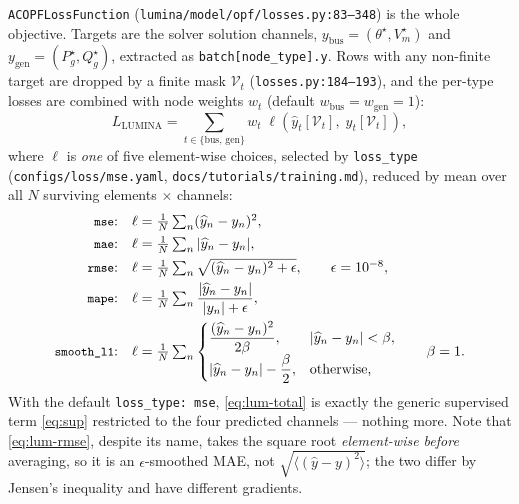 \documentclass[11pt]{article}
\newcommand{\pred}[1]{\widehat{#1}}
\newcommand{\code}[1]{\texttt{\small #1}}
\begin{document}
\code{ACOPFLossFunction} (\code{lumina/model/opf/losses.py:83--348}) is the whole objective.
Targets are the solver solution channels, $y_{\mathrm{bus}}=(\theta^\star,V^\star_m)$ and
$y_{\mathrm{gen}}=(P^\star_g,Q^\star_g)$, extracted as \code{batch[node\_type].y}. Rows with
any non-finite target are dropped by a finite mask $\mathcal{V}_t$
(\code{losses.py:184--193}), and the per-type losses are combined with node weights
$w_t$ (default $w_{\mathrm{bus}}=w_{\mathrm{gen}}=1$):
\begin{equation}
\boxed{\;
L_{\mathrm{LUMINA}}
=\sum_{t\in\{\mathrm{bus},\,\mathrm{gen}\}} w_t\;
\ell\!\left(\pred{y}_t[\mathcal{V}_t],\;y_t[\mathcal{V}_t]\right),
\;}
\label{eq:lum-total}
\end{equation}
where $\ell$ is \emph{one} of five element-wise choices, selected by \code{loss\_type}
(\code{configs/loss/mse.yaml}, \code{docs/tutorials/training.md}), reduced by mean over all
$N$ surviving elements $\times$ channels:
\begin{align}
\text{\code{mse}:}\quad & \ell=\tfrac{1}{N}\textstyle\sum_n (\pred{y}_n-y_n)^2,
\label{eq:lum-mse}\\
\text{\code{mae}:}\quad & \ell=\tfrac{1}{N}\textstyle\sum_n |\pred{y}_n-y_n|,
\label{eq:lum-mae}\\
\text{\code{rmse}:}\quad & \ell=\tfrac{1}{N}\textstyle\sum_n \sqrt{(\pred{y}_n-y_n)^2+\epsilon},
\qquad \epsilon=10^{-8},
\label{eq:lum-rmse}\\
\text{\code{mape}:}\quad & \ell=\tfrac{1}{N}\textstyle\sum_n \dfrac{|\pred{y}_n-y_n|}{|y_n|+\epsilon},
\label{eq:lum-mape}\\
\text{\code{smooth\_l1}:}\quad & \ell=\tfrac{1}{N}\textstyle\sum_n
\begin{cases}
\dfrac{(\pred{y}_n-y_n)^2}{2\beta}, & |\pred{y}_n-y_n|<\beta,\\[4pt]
|\pred{y}_n-y_n|-\dfrac{\beta}{2}, & \text{otherwise,}
\end{cases}
\qquad \beta=1 .
\label{eq:lum-huber}
\end{align}
With the default \code{loss\_type: mse}, \eqref{eq:lum-total} is exactly the generic
supervised term \eqref{eq:sup} restricted to the four predicted channels --- nothing more.
Note that \eqref{eq:lum-rmse}, despite its name, takes the square root \emph{element-wise
before} averaging, so it is an $\epsilon$-smoothed MAE, not
$\sqrt{\langle(\pred{y}-y)^2\rangle}$; the two differ by Jensen's inequality and have
different gradients.
\end{document}
